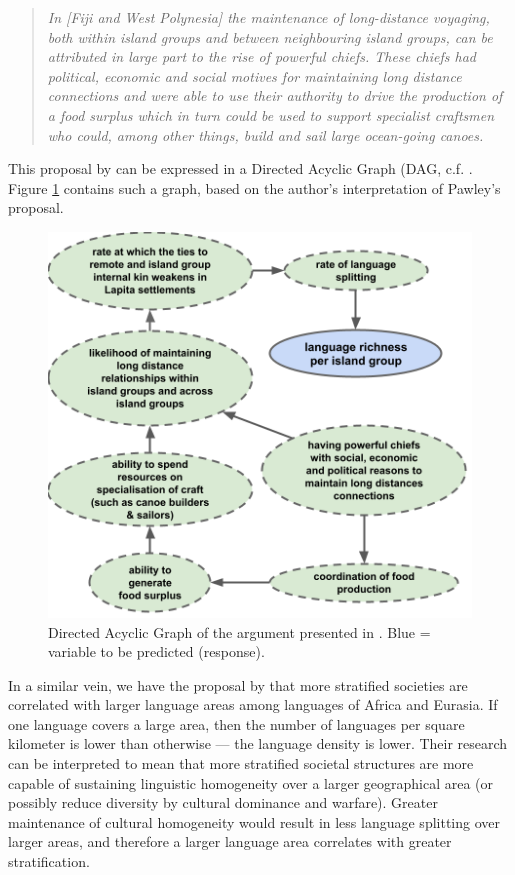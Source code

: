 \documentclass[a4paper,10pt]{article} %
\begin{document}
\begin{quotation}
\noindent \emph{In [Fiji and West Polynesia] the maintenance of long-distance voyaging, both within island groups and between neighbouring island groups, can be attributed in large part to the rise of powerful chiefs. These chiefs had political, economic and social motives for maintaining long distance connections and were able to use their authority to drive the production of a food surplus which in turn could be used to support specialist craftsmen who could, among other things, build and sail large ocean-going canoes.} \citep[28]{pawley2007} \end{quotation}

This proposal by \citet{pawley81, pawley2007} can be expressed in a Directed Acyclic Graph (DAG, c.f. \cite{mcelreath2020statistical}. Figure \ref{Predicting_lgs_DAG_andy} contains such a graph, based on the author's interpretation of Pawley's proposal.

\begin{figure}[ht]
\centering
\includegraphics[width=14cm]{Predicting_lgs_DAG_andy.png}
\caption{Directed Acyclic Graph of the argument presented in \cite{pawley2007}. Blue = variable to be predicted (response).}
\label{Predicting_lgs_DAG_andy}
\end{figure}

In a similar vein, we have the proposal by \citet{curriemace2009} that more stratified societies are correlated with larger language areas among languages of Africa and Eurasia. If one language covers a large area, then the number of languages per square kilometer is lower than otherwise --- the language density is lower. Their research can be interpreted to mean that more stratified societal structures are more capable of sustaining linguistic homogeneity over a larger geographical area (or possibly reduce diversity by cultural dominance and warfare). Greater maintenance of cultural homogeneity would result in less language splitting over larger areas, and therefore a larger language area correlates with greater stratification. 
\end{document}
